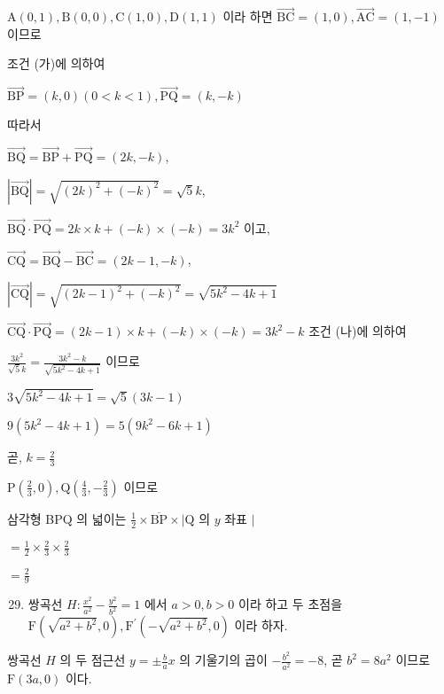 \documentclass[10pt]{article}
\begin{document}
$\mathrm{A}(0,1), \mathrm{B}(0,0), \mathrm{C}(1,0), \mathrm{D}(1,1)$ 이라 하면 $\overrightarrow{\mathrm{BC}}=(1,0), \overrightarrow{\mathrm{AC}}=(1,-1)$ 이므로

조건 (가)에 의하여

$\overrightarrow{\mathrm{BP}}=(k, 0)(0<k<1), \overrightarrow{\mathrm{PQ}}=(k,-k)$

따라서

$\overrightarrow{\mathrm{BQ}}=\overrightarrow{\mathrm{BP}}+\overrightarrow{\mathrm{PQ}}=(2 k,-k)$,

$|\overrightarrow{\mathrm{BQ}}|=\sqrt{(2 k)^{2}+(-k)^{2}}=\sqrt{5} k$,

$\overrightarrow{\mathrm{BQ}} \cdot \overrightarrow{\mathrm{PQ}}=2 k \times k+(-k) \times(-k)=3 k^{2}$ 이고,

$\overrightarrow{\mathrm{CQ}}=\overrightarrow{\mathrm{BQ}}-\overrightarrow{\mathrm{BC}}=(2 k-1,-k)$,

$|\overrightarrow{\mathrm{CQ}}|=\sqrt{(2 k-1)^{2}+(-k)^{2}}=\sqrt{5 k^{2}-4 k+1}$

$\overrightarrow{\mathrm{CQ}} \cdot \overrightarrow{\mathrm{PQ}}=(2 k-1) \times k+(-k) \times(-k)=3 k^{2}-k$ 조건 (나)에 의하여

$\frac{3 k^{2}}{\sqrt{5} k}=\frac{3 k^{2}-k}{\sqrt{5 k^{2}-4 k+1}}$ 이므로

$3 \sqrt{5 k^{2}-4 k+1}=\sqrt{5}(3 k-1)$

$9\left(5 k^{2}-4 k+1\right)=5\left(9 k^{2}-6 k+1\right)$

곧, $k=\frac{2}{3}$

$\mathrm{P}\left(\frac{2}{3}, 0\right), \mathrm{Q}\left(\frac{4}{3},-\frac{2}{3}\right)$ 이므로

삼각형 BPQ 의 넓이는 $\frac{1}{2} \times \overline{\mathrm{BP}} \times \mid \mathrm{Q}$ 의 $y$ 좌표 $\mid$

$=\frac{1}{2} \times \frac{2}{3} \times \frac{2}{3}$

$=\frac{2}{9}$

\begin{enumerate}
  \setcounter{enumi}{28}
  \item 쌍곡선 $H: \frac{x^{2}}{a^{2}}-\frac{y^{2}}{b^{2}}=1$ 에서 $a>0, b>0$ 이라 하고 두 초점을 $\mathrm{F}\left(\sqrt{a^{2}+b^{2}}, 0\right), \mathrm{F}^{\prime}\left(-\sqrt{a^{2}+b^{2}}, 0\right)$ 이라 하자.
\end{enumerate}

쌍곡선 $H$ 의 두 점근선 $y= \pm \frac{b}{a} x$ 의 기울기의 곱이 $-\frac{b^{2}}{a^{2}}=-8$, 곧 $b^{2}=8 a^{2}$ 이므로 $\mathrm{F}(3 a, 0)$ 이다.
\end{document}
